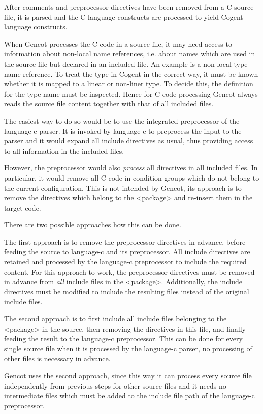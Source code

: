 
After comments and preprocessor directives have been removed from a C source file, it is parsed and
the C language constructs are processed to yield Cogent language constructs. 

When Gencot processes the C code in a source file, it may need access to information about non-local name references, 
i.e. about names which are used in the source file but declared in an included file. 
An example is a non-local type name reference. To treat the type in Cogent in the correct way, it must be known whether
it is mapped to a linear or non-liner type. To decide this, the definition for the type name must be inspected.
Hence for C code processing Gencot always reads the source file content together with that of all included files.

The easiest way to do so would be to use the integrated preprocessor of the language-c parser. It is invoked by
language-c to preprocess the input to the parser and it would expand all include directives as usual, thus providing
access to all information in the included files.

However, the preprocessor would also \textit{process} all directives in all included files. In particular, it would
remove all C code in condition groups which do not belong to the current configuration. This is not intended by Gencot,
its approach is to remove the directives which belong to the <package> and re-insert them in the target code.

There are two possible approaches how this can be done.

The first approach is to remove the preprocessor directives in advance, before feeding the source to language-c and 
its preprocessor. All include directives are retained and processed by the language-c preprocessor to include the
required content. For this approach to work, the preprocessor directives must be removed in advance from \textit{all} 
include files in the <package>. Additionally, the include directives must be modified to include the resulting
files instead of the original include files. 

The second approach is to first include all include files belonging to the <package> in the source, then removing the
directives in this file, and finally feeding the result to the language-c preprocessor. This can be done for every 
single source file when it is processed by the language-c parser, no processing of other files is necessary in advance.

Gencot uses the second approach, since this way it can process every source file independently from previous steps for 
other source files and it needs no intermediate files which must be added to the include file path of the language-c
preprocessor.


